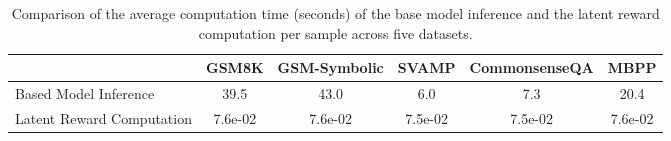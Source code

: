 \begin{table}[t]
\centering
\newcommand{\newscriptspace}{\makebox[\widthof{e-0}]{}}
\newcommand{\newscriptspacebig}{\makebox[\widthof{e-00}]{}} 
\small
\caption{Comparison of the average computation time (seconds) of the base model inference and the latent reward computation per sample across five datasets.}
\begin{tabular}{lccccc}
\toprule
                       & 
                       \textbf{GSM8K}&\textbf{GSM-Symbolic}&\textbf{SVAMP} & \textbf{CommonsenseQA}  & \textbf{MBPP}
\\ \midrule 
Based Model Inference&\newscriptspace39.5&\newscriptspace43.0&\newscriptspacebig6.0&\newscriptspacebig7.3&\newscriptspace20.4\\
Latent Reward Computation&7.6e-02&7.6e-02&7.5e-02&7.5e-02&7.6e-02\\
\bottomrule
\end{tabular}
\label{tab:sampling_efficiency_analysis}
\end{table}
